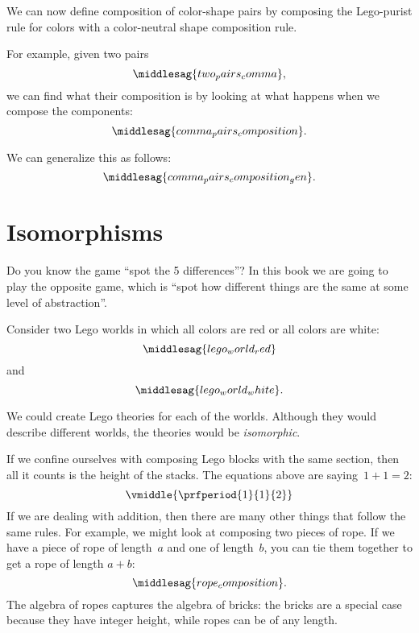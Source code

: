 We can now define composition of color-shape pairs by composing the Lego-purist rule for colors with a color-neutral shape composition rule.

For example, given two pairs
%
\begin{equation}
    \label{eq:two_pairs_comma}
    \middlesag{two_pairs_comma},
\end{equation}
%
we can find what their composition is by looking at what happens when we compose the components:
%
\begin{equation}
    \label{eq:comma_pairs_composition}
    \middlesag{comma_pairs_composition}.
\end{equation}

We can generalize this as follows:
\begin{equation}
    \label{eq:comma_pairs_composition_gen}
    \middlesag{comma_pairs_composition_gen}.
\end{equation}

\section{Isomorphisms}

Do you know the game ``spot the 5 differences''?
In this book we are going to play the opposite game, which is ``spot how different things are the same at some level of abstraction''.

Consider two Lego worlds in which all colors are red or all colors are white:
\begin{equation}
    \label{eq:lego_world_red}
    \middlesag{lego_world_red}
\end{equation}
%
and
%
\begin{equation}
    \label{eq:lego_world_white}
    \middlesag{lego_world_white}.
\end{equation}

We could create Lego theories for each of the worlds.
Although they would describe different worlds, the theories would be \emph{isomorphic}.

If we confine ourselves with composing Lego blocks with the same section, then all it counts is the height of the stacks.
The equations above are saying~$1+1=2$:
%
\begin{equation}
    \vmiddle{\prfperiod{1}{1}{2}}
\end{equation}
%
If we are dealing with addition, then there are many other things that follow the same rules.
For example, we might look at composing two pieces of rope.
If we have a piece of rope of length~$a$ and one of length~$b$, you can tie them together to get a rope of length $a+b$:
%
\begin{equation}
    \label{eq:rope-compose}
    \middlesag{rope_composition}.
\end{equation}
%
The algebra of ropes captures the algebra of bricks: the bricks are a special case because they have integer height, while ropes can be of any length.

